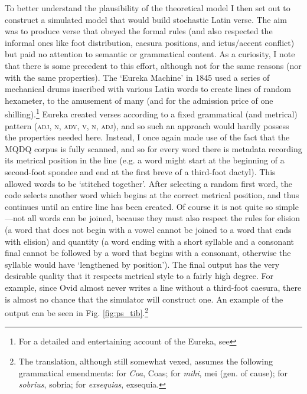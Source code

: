 \documentclass[twocolumn, switch, a4paper]{article} %
\begin{document}
To better understand the plausibility of the theoretical model I then set out
to construct a simulated model that would build stochastic Latin verse. The
aim was to produce verse that obeyed the formal rules (and also respected the
informal ones like foot distribution, caesura positions, and ictus/accent
conflict) but paid no attention to semantic or grammatical content. As a
curiosity, I note that there is some precedent to this effort, although not
for the same reasons (nor with the same properties). The `Eureka Machine' in
1845 used a series of mechanical drums inscribed with various Latin words to
create lines of random hexameter, to the amusement of many (and for the
admission price of one shilling).\footnote{
  For a detailed and entertaining account of the Eureka, see 
}
Eureka created verses according to a fixed grammatical (and metrical) pattern
(\textsc{adj}, \textsc{n}, \textsc{adv}, \textsc{v}, \textsc{n},
\textsc{adj}), and so such an approach would hardly possess the properties
needed here. Instead, I once again made use of the fact that the MQDQ corpus
is fully scanned, and so for every word there is metadata recording its
metrical position in the line (e.g. a word might start at the beginning of a
second-foot spondee and end at the first breve of a third-foot dactyl). This
allowed words to be `stitched together'. After selecting a random first word,
the code selects another word which begins at the correct metrical position,
and thus continues until an entire line has been created. Of course it is not
quite so simple---not all words can be joined, because they must also respect
the rules for elision (a word that does not begin with a vowel cannot be
joined to a word that ends with elision) and quantity (a word ending with a
short syllable and a consonant final cannot be followed by a word that begins
with a consonant, otherwise the syllable would have `lengthened by position').
The final output has the very desirable quality that it respects metrical
style to a fairly high degree. For example, since Ovid almost never writes a
line without a third-foot caesura, there is almost no chance that the
simulator will construct one. An example of the output can be seen in Fig.
\ref{fig:ps_tib}.\footnote{
  The translation, although still somewhat vexed, assumes the following
  grammatical emendments: for \emph{Coa}, Coas; for \emph{mihi}, mei (gen. of
  cause); for \emph{sobrius}, sobria; for \emph{exsequias}, exsequia.
}
\end{document}
